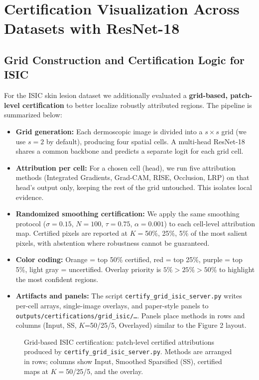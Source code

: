\documentclass[11pt]{article}
\begin{document}
\newpage


\section{Certification Visualization Across Datasets with ResNet-18}

\subsection{Grid Construction and Certification Logic for ISIC}

For the ISIC skin lesion dataset we additionally evaluated a \textbf{grid-based, patch-level certification} to better localize robustly attributed regions. The pipeline is summarized below:

\begin{itemize}
    \item \textbf{Grid generation:} Each dermoscopic image is divided into a $s \times s$ grid (we use $s{=}2$ by default), producing four spatial cells. A multi-head ResNet-18 shares a common backbone and predicts a separate logit for each grid cell.
    \item \textbf{Attribution per cell:} For a chosen cell (head), we run five attribution methods (Integrated Gradients, Grad-CAM, RISE, Occlusion, LRP) on that head's output only, keeping the rest of the grid untouched. This isolates local evidence.
    \item \textbf{Randomized smoothing certification:} We apply the same smoothing protocol ($\sigma{=}0.15$, $N{=}100$, $\tau{=}0.75$, $\alpha{=}0.001$) to each cell-level attribution map. Certified pixels are reported at $K{=}$50\%, 25\%, 5\% of the most salient pixels, with abstention where robustness cannot be guaranteed.
    \item \textbf{Color coding:} Orange = top 50\% certified, red = top 25\%, purple = top 5\%, light gray = uncertified. Overlay priority is $5\% > 25\% > 50\%$ to highlight the most confident regions.
    \item \textbf{Artifacts and panels:} The script \texttt{certify\_grid\_isic\_server.py} writes per-cell arrays, single-image overlays, and paper-style panels to \texttt{outputs/certifications/grid\_isic/\dots}. Panels place methods in rows and columns (Input, SS, $K$=50/25/5, Overlayed) similar to the Figure 2 layout.
\end{itemize}

\begin{figure}[H]
    \centering
    \caption{Grid-based ISIC certification: patch-level certified attributions produced by \texttt{certify\_grid\_isic\_server.py}. Methods are arranged in rows; columns show Input, Smoothed Sparsified (SS), certified maps at $K{=}$50/25/5, and the overlay.}
    \label{fig:isic_grid_cert}
\end{figure}
\end{document}
